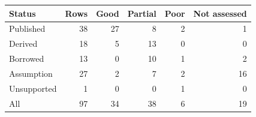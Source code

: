 \begin{tabular}{@{}lrrrrr@{}}
\toprule
Status & Rows & Good & Partial & Poor & Not assessed \\
\midrule
Published & 38 & 27 & 8 & 2 & 1 \\
Derived & 18 & 5 & 13 & 0 & 0 \\
Borrowed & 13 & 0 & 10 & 1 & 2 \\
Assumption & 27 & 2 & 7 & 2 & 16 \\
Unsupported & 1 & 0 & 0 & 1 & 0 \\
All & 97 & 34 & 38 & 6 & 19 \\
\bottomrule
\end{tabular}
